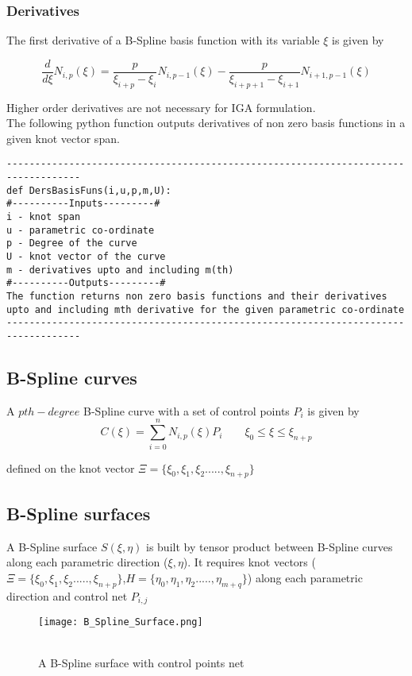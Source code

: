 \documentclass[11pt]{article}
\begin{document}
\subsubsection{Derivatives }
The first derivative of a B-Spline basis function \cite{nguyen2012introduction} with its variable $\xi$ is
given by

\begin{equation}
\frac{d}{d\xi}N_{i,p}(\xi) = \frac{p}{\xi_{i+p}-\xi_{i}} N_{i,p-1}(\xi) -
\frac{p}{\xi_{i+p+1}-\xi_{i+1}} N_{i+1,p-1}(\xi)
\end{equation}

\noindent
Higher order derivatives are not necessary for IGA formulation.\\
The following python function outputs derivatives of non zero basis functions in a given knot vector span.
\begin{verbatim}
-----------------------------------------------------------------------------------
def DersBasisFuns(i,u,p,m,U):
#----------Inputs---------#
i - knot span
u - parametric co-ordinate
p - Degree of the curve
U - knot vector of the curve
m - derivatives upto and including m(th) 
#----------Outputs---------#
The function returns non zero basis functions and their derivatives
upto and including mth derivative for the given parametric co-ordinate
-----------------------------------------------------------------------------------
\end{verbatim}

\subsection{B-Spline curves}

A $pth-degree$ B-Spline curve with a set of control points $P_i$ is given by \cite{piegl2012nurbs}
\begin{equation}
C(\xi) = \sum_{i=0}^{n} N_{i,p}(\xi) P_i \qquad \xi_0 \leq \xi \leq \xi_{n+p}
\end{equation}

\noindent
defined on the knot vector $\Xi = \{ \xi_0,\xi_1,\xi_2.....,\xi_{n+p}\}$

\subsection{B-Spline surfaces}
A B-Spline surface $S(\xi,\eta)$ is built by tensor product between B-Spline
curves along each parametric direction ($\xi,\eta$). It requires knot vectors
($\Xi = \{ \xi_0,\xi_1,\xi_2.....,\xi_{n+p}\}$,$H =
\{\eta_0,\eta_1,\eta_2.....,\eta_{m+q}\}$) along each parametric direction and
control net $P_{i,j}$
\begin{figure}[H]
	\begin{center}
		\texttt{[image: B\_Spline\_Surface.png]} 
		\caption{\\A B-Spline surface with control points net \cite{siggel2017tigl}}\label{B_Spline_Surface}
	\end{center}	
\end{figure}
\end{document}
